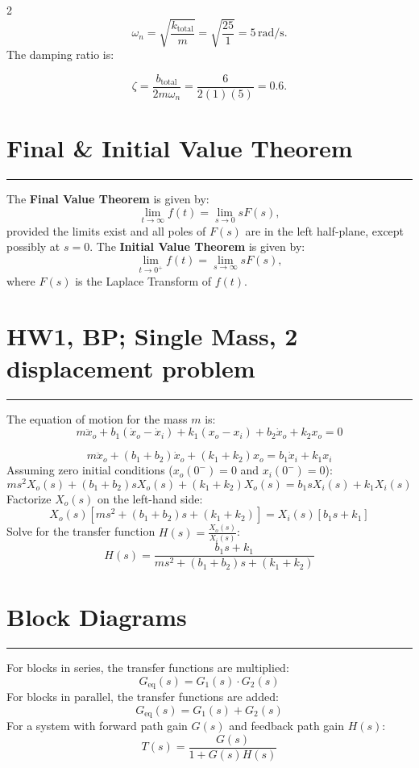 \documentclass[letterpaper,10pt]{article}
\let\oldsection\section
\renewcommand{\section}[1]{%
\vspace{-1em}
  \oldsection{#1}%
  \par\vspace{-2em}%
  \noindent\rule{0.5\textwidth}{0.5pt}%
  \vspace{0em}%
}
\begin{document}
\begin{multicols}{2}
\[
\omega_n = \sqrt{\frac{k_\text{total}}{m}} = \sqrt{\frac{25}{1}} = 5 \, \text{rad/s}.
\]
\newline The damping ratio is:

\[
\zeta = \frac{b_\text{total}}{2m\omega_n} = \frac{6}{2(1)(5)} = 0.6.
\]

\section{Final \& Initial Value Theorem}
The \textbf{Final Value Theorem} is given by:
\begin{equation*}
    \lim_{t \to \infty} f(t) = \lim_{s \to 0} s F(s),
\end{equation*}
provided the limits exist and all poles of $F(s)$ are in the left half-plane, except possibly at $s = 0$.
\newline
The \textbf{Initial Value Theorem} is given by:
\begin{equation*}
    \lim_{t \to 0^+} f(t) = \lim_{s \to \infty} s F(s),
\end{equation*}
where $F(s)$ is the Laplace Transform of $f(t)$.

\section{HW1, BP; Single Mass, 2 displacement problem}
The equation of motion for the mass \(m\) is:
\[
m \ddot{x}_o + b_1 (\dot{x}_o - \dot{x}_i) + k_1 (x_o - x_i) + b_2 \dot{x}_o + k_2 x_o = 0
\]

\[
m \ddot{x}_o + (b_1 + b_2) \dot{x}_o + (k_1 + k_2) x_o = b_1 \dot{x}_i + k_1 x_i
\]
Assuming zero initial conditions (\(x_o(0^-) = 0\) and \(x_i(0^-) = 0\)):
\[
m s^2 X_o(s) + (b_1 + b_2) s X_o(s) + (k_1 + k_2) X_o(s) = b_1 s X_i(s) + k_1 X_i(s)
\]
Factorize \(X_o(s)\) on the left-hand side:
\[
X_o(s) \left[ m s^2 + (b_1 + b_2) s + (k_1 + k_2) \right] = X_i(s) \left[ b_1 s + k_1 \right]
\]
Solve for the transfer function \(H(s) = \frac{X_o(s)}{X_i(s)}\):
\[
H(s) = \frac{b_1 s + k_1}{m s^2 + (b_1 + b_2) s + (k_1 + k_2)}
\]
\vspace{-1em} \section{Block Diagrams}
For blocks in series, the transfer functions are multiplied:
\[
G_{\text{eq}}(s) = G_1(s) \cdot G_2(s)
\]
For blocks in parallel, the transfer functions are added:
\[
G_{\text{eq}}(s) = G_1(s) + G_2(s)
\]
For a system with forward path gain \( G(s) \) and feedback path gain \( H(s) \):
\[
T(s) = \frac{G(s)}{1 + G(s)H(s)}
\]


\end{multicols}
\end{document}
